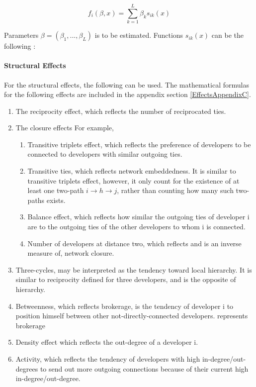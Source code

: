 \documentclass[11pt]{report}
\begin{document}
\begin{equation}
f_i(\beta, x) = \sum_{k = 1}^{L} \beta_k s_{ik}(x)
\end{equation}

Parameters $\beta = (\beta_1, ..., \beta_L)$ is to be estimated. Functions $s_{ik}(x)$ can be the following \cite{Snijders2004}:

\paragraph{Structural Effects}
For the structural effects, the following can be used. The mathematical formulas for the following effects are included in the appendix section \ref{EffectsAppendixC}. 

\begin{enumerate}
\item{The reciprocity effect, which reflects the number of reciprocated ties. }
\item{The closure effects}
For example, 
\begin{enumerate}
\item Transitive triplets effect, which reflects the preference of developers to be connected to developers with similar outgoing ties. 
\item Transitive ties, which reflects network embeddedness. It is similar to transitive triplets effect, however, it only count for the existence of at least one two-path  $i \rightarrow h \rightarrow j$, rather than counting how many such two-paths exists.  
\item Balance effect, which reflects how similar the outgoing ties of developer i are to the outgoing ties of the other developers to whom i is connected. 
\item Number of developers at distance two, which reflects and is an inverse measure of, network closure. 
\end{enumerate}
\item{Three-cycles, may be interpreted as the tendency toward local hierarchy. It is similar to reciprocity defined for three developers, and is the opposite of hierarchy.}
\item{Betweenness, which reflects brokerage, is the tendency of developer i to position himself between other not-directly-connected developers.}
represents brokerage
\item{Density effect which reflects the out-degree of a developer i.}
\item{Activity, which reflects the tendency of developers with high in-degree/out-degrees to send out more outgoing connections because of their current high in-degree/out-degree.} 

\end{enumerate}
\end{document}

